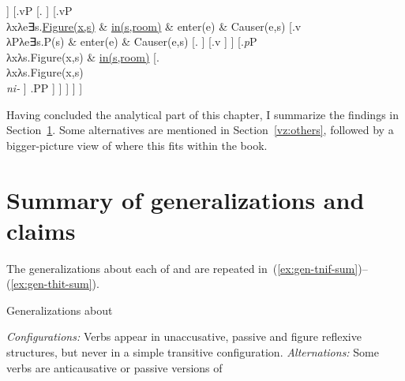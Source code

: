 \begin{exe}
\begin{xlist}
\begin{xlist}
\begin{exe}
\begin{xlist}
\begin{xlist}
\begin{exe}
\begin{xlist}
\begin{xlist}
\begin{exe}
\begin{exe}
\begin{xlist}
\begin{exe}
\begin{exe}
\begin{xlist}
\begin{exe}
\begin{exe}
\begin{exe}
\begin{exe}
\begin{exe}
\begin{xlist}
\begin{exe}
\begin{xlist}
\begin{exe}
\begin{exe}
\begin{xlist}
\begin{exe}
\begin{xlist}
\begin{exe}
\begin{xlist}
\begin{exe}
\begin{exe}
\begin{exe}
\begin{xlist}
\begin{exe}
\begin{exe}
\begin{exe}
\begin{xlist}
\begin{exe}
\begin{xlist}
\begin{exe}
\begin{xlist}
\begin{exe}
\begin{xlist}
\begin{exe}
\begin{exe}
\begin{exe}
\begin{exe}
\begin{xlist}
\begin{exe}
\begin{xlist}
\begin{exe}
\begin{xlist}
\begin{exe}
\begin{xlist}
\begin{exe}
\begin{xlist}
\begin{exe}
\begin{xlist}
\begin{exe}
\begin{exe}
\begin{exe}
\begin{exe}
\begin{xlist}
\begin{exe}
\begin{xlist}
\begin{exe}
\begin{xlist}
\begin{exe}
\begin{exe}
\begin{xlist}
\begin{exe}
\begin{xlist}
\begin{exe}
\begin{exe}
\begin{exe}
\begin{exe}
\begin{xlist}
\begin{xlist}
\begin{exe}
\begin{xlist}
\begin{exe}
\begin{exe}
\begin{exe}
\begin{xlist}
\begin{exe}
\begin{exe}
\begin{xlist}
\begin{exe}
\begin{exe}
\begin{exe}
\begin{xlist}
\begin{xlist}
\begin{exe}
\begin{xlist}
\begin{exe}
\begin{exe}
\begin{exe}
\begin{exe}
\begin{xlist}
\begin{exe}
\begin{xlist}
\begin{exe}
\begin{xlist}
\begin{exe}
\begin{xlist}
\begin{exe}
\begin{exe}
\begin{exe}
\begin{exe}
\begin{exe}
\begin{exe}
\begin{xlist}
\begin{exe}
\begin{xlist}
\begin{exe}
\begin{xlist}
{{]
			[.vP
				[.{\va} ]
	           [.{vP\\ λxλe∃s.\underline{Figure(x,s)} \& \underline{in(s,room)} \& enter(e) \& Causer(e,s)}
	              [.{v\\ λPλe∃s.P(s) \& enter(e) \& Causer(e,s)}
		             [. ]
		             [.v ]
	              ]
	              [.{\emph{p}P\\ λxλs.Figure(x,s) \& \underline{in(s,room)}}
	                  [.{\pz\\ λxλs.Figure(x,s)\\ \emph{ni-}} ]
	                  .PP
	              ]
	          ]
	        ]
       ]
    ]
}
}


Having concluded the analytical part of this chapter, I summarize the findings in Section~\ref{vz:sum}. Some alternatives are mentioned in Section~\ref{vz:others}, followed by a bigger-picture view of where this fits within the book.


\section{Summary of generalizations and claims} \label{vz:sum}
The generalizations about each of {\tnif} and {\thit} are repeated in~(\ref{ex:gen-tnif-sum})--(\ref{ex:gen-thit-sum}).

 \begin{exe}
 \ex  \label{ex:gen-tnif-sum}Generalizations about {\tnif}
 \begin{xlist} 
 	\ex  \textit{Configurations:} Verbs appear in unaccusative, passive and figure reflexive structures, but never in a simple transitive configuration. 
 	\ex  \textit{Alternations:} Some verbs are anticausative or passive versions of 
\end{xlist}
\end{exe}
\end{xlist}
\end{exe}
\end{xlist}
\end{exe}
\end{xlist}
\end{exe}
\end{exe}
\end{exe}
\end{exe}
\end{exe}
\end{exe}
\end{xlist}
\end{exe}
\end{xlist}
\end{exe}
\end{xlist}
\end{exe}
\end{xlist}
\end{exe}
\end{exe}
\end{exe}
\end{exe}
\end{xlist}
\end{exe}
\end{xlist}
\end{xlist}
\end{exe}
\end{exe}
\end{exe}
\end{xlist}
\end{exe}
\end{exe}
\end{xlist}
\end{exe}
\end{exe}
\end{exe}
\end{xlist}
\end{exe}
\end{xlist}
\end{xlist}
\end{exe}
\end{exe}
\end{exe}
\end{exe}
\end{xlist}
\end{exe}
\end{xlist}
\end{exe}
\end{exe}
\end{xlist}
\end{exe}
\end{xlist}
\end{exe}
\end{xlist}
\end{exe}
\end{exe}
\end{exe}
\end{exe}
\end{xlist}
\end{exe}
\end{xlist}
\end{exe}
\end{xlist}
\end{exe}
\end{xlist}
\end{exe}
\end{xlist}
\end{exe}
\end{xlist}
\end{exe}
\end{exe}
\end{exe}
\end{exe}
\end{xlist}
\end{exe}
\end{xlist}
\end{exe}
\end{xlist}
\end{exe}
\end{xlist}
\end{exe}
\end{exe}
\end{exe}
\end{xlist}
\end{exe}
\end{exe}
\end{exe}
\end{xlist}
\end{exe}
\end{xlist}
\end{exe}
\end{xlist}
\end{exe}
\end{exe}
\end{xlist}
\end{exe}
\end{xlist}
\end{exe}
\end{exe}
\end{exe}
\end{exe}
\end{exe}
\end{xlist}
\end{exe}
\end{exe}
\end{xlist}
\end{exe}
\end{exe}
\end{xlist}
\end{xlist}
\end{exe}
\end{xlist}
\end{xlist}
\end{exe}
\end{xlist}
\end{xlist}
\end{exe}
